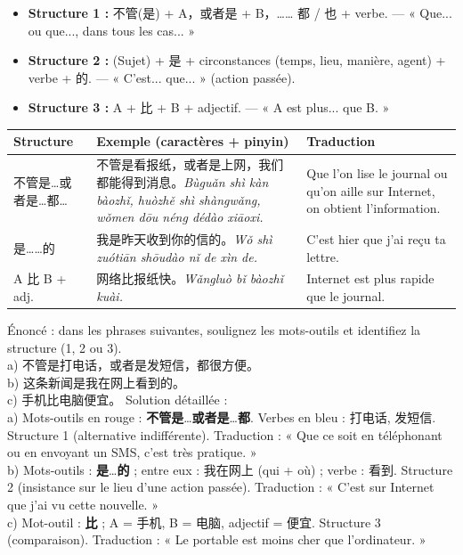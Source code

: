 \documentclass[11pt]{article}
\newcommand{\cle}[1]{{\popxbold\color{popdark}#1}}
\begin{document}
\begin{aretenir}
\begin{itemize}
\item \textbf{Structure 1 :} 不管(是) + A，或者是 + B，…… \cle{都} / 也 + verbe. — « Que... ou que..., dans tous les cas... »
\item \textbf{Structure 2 :} (Sujet) + \cle{是} + circonstances (temps, lieu, manière, agent) + verbe + \cle{的}. — « C'est... que... » (action passée).
\item \textbf{Structure 3 :} A + \cle{比} + B + adjectif. — « A est plus... que B. »
\end{itemize}
\end{aretenir}

\begin{center}
\begin{tabularx}{\linewidth}{|X|X|X|}
\hline
\rowcolor{popblueL} Structure & Exemple (caractères + pinyin) & Traduction \\
\hline
不管是…或者是…都… & 不管是看报纸，或者是上网，我们都能得到消息。\newline \emph{Bùguǎn shì kàn bàozhǐ, huòzhě shì shàngwǎng, wǒmen dōu néng dédào xiāoxi.} & Que l'on lise le journal ou qu'on aille sur Internet, on obtient l'information. \\
\hline
是……的 & 我是昨天收到你的信的。\newline \emph{Wǒ shì zuótiān shōudào nǐ de xìn de.} & C'est hier que j'ai reçu ta lettre. \\
\hline
A 比 B + adj. & 网络比报纸快。\newline \emph{Wǎngluò bǐ bàozhǐ kuài.} & Internet est plus rapide que le journal. \\
\hline
\end{tabularx}
\end{center}

\begin{exoresolu}
Énoncé : dans les phrases suivantes, soulignez les mots-outils et identifiez la structure (1, 2 ou 3).\\
a) 不管是打电话，或者是发短信，都很方便。\\
b) 这条新闻是我在网上看到的。\\
c) 手机比电脑便宜。
\tcblower
Solution détaillée :\\
a) Mots-outils en rouge : \textbf{不管是}…\textbf{或者是}…\textbf{都}. Verbes en bleu : 打电话, 发短信. Structure 1 (alternative indifférente). Traduction : « Que ce soit en téléphonant ou en envoyant un SMS, c'est très pratique. »\\
b) Mots-outils : \textbf{是}…\textbf{的} ; entre eux : 我在网上 (qui + où) ; verbe : 看到. Structure 2 (insistance sur le lieu d'une action passée). Traduction : « C'est sur Internet que j'ai vu cette nouvelle. »\\
c) Mot-outil : \textbf{比} ; A = 手机, B = 电脑, adjectif = 便宜. Structure 3 (comparaison). Traduction : « Le portable est moins cher que l'ordinateur. »
\end{exoresolu}
\end{document}
